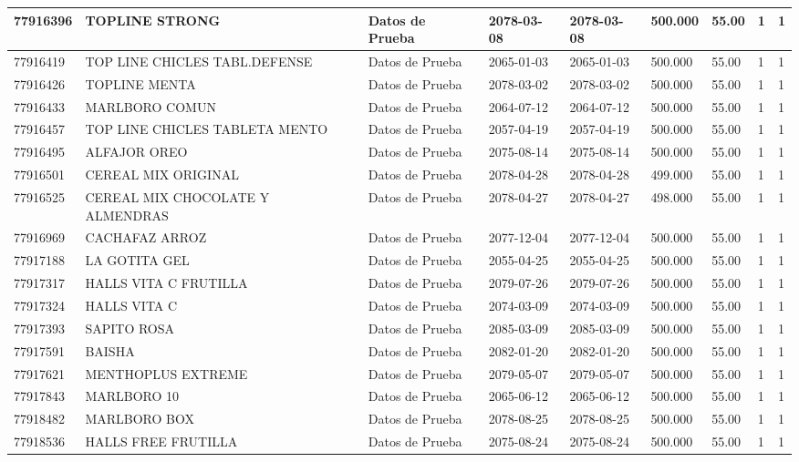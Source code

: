 \documentclass[a4paper,12pt]{article}
\begin{document}
\begin{landscape}
\begin{longtable}{|p{4cm}|p{2.5cm}|p{2.5cm}|p{1.8cm}|p{1.8cm}|p{1cm}|p{1cm}|p{3cm}|p{3cm}||}
77916396 & TOPLINE STRONG & Datos de Prueba & 2078-03-08 & 2078-03-08 & 500.000 & 55.00 & 1 & 1 \\ \hline 
77916419 & TOP LINE CHICLES TABL.DEFENSE & Datos de Prueba & 2065-01-03 & 2065-01-03 & 500.000 & 55.00 & 1 & 1 \\ \hline 
77916426 & TOPLINE  MENTA & Datos de Prueba & 2078-03-02 & 2078-03-02 & 500.000 & 55.00 & 1 & 1 \\ \hline 
77916433 & MARLBORO COMUN & Datos de Prueba & 2064-07-12 & 2064-07-12 & 500.000 & 55.00 & 1 & 1 \\ \hline 
77916457 & TOP LINE CHICLES TABLETA MENTO & Datos de Prueba & 2057-04-19 & 2057-04-19 & 500.000 & 55.00 & 1 & 1 \\ \hline 
77916495 & ALFAJOR OREO & Datos de Prueba & 2075-08-14 & 2075-08-14 & 500.000 & 55.00 & 1 & 1 \\ \hline 
77916501 & CEREAL MIX ORIGINAL & Datos de Prueba & 2078-04-28 & 2078-04-28 & 499.000 & 55.00 & 1 & 1 \\ \hline 
77916525 & CEREAL MIX CHOCOLATE Y ALMENDRAS & Datos de Prueba & 2078-04-27 & 2078-04-27 & 498.000 & 55.00 & 1 & 1 \\ \hline 
77916969 & CACHAFAZ ARROZ & Datos de Prueba & 2077-12-04 & 2077-12-04 & 500.000 & 55.00 & 1 & 1 \\ \hline 
77917188 & LA GOTITA GEL & Datos de Prueba & 2055-04-25 & 2055-04-25 & 500.000 & 55.00 & 1 & 1 \\ \hline 
77917317 & HALLS VITA C FRUTILLA & Datos de Prueba & 2079-07-26 & 2079-07-26 & 500.000 & 55.00 & 1 & 1 \\ \hline 
77917324 & HALLS VITA C & Datos de Prueba & 2074-03-09 & 2074-03-09 & 500.000 & 55.00 & 1 & 1 \\ \hline 
77917393 & SAPITO ROSA & Datos de Prueba & 2085-03-09 & 2085-03-09 & 500.000 & 55.00 & 1 & 1 \\ \hline 
77917591 & BAISHA & Datos de Prueba & 2082-01-20 & 2082-01-20 & 500.000 & 55.00 & 1 & 1 \\ \hline 
77917621 & MENTHOPLUS EXTREME & Datos de Prueba & 2079-05-07 & 2079-05-07 & 500.000 & 55.00 & 1 & 1 \\ \hline 
77917843 & MARLBORO 10 & Datos de Prueba & 2065-06-12 & 2065-06-12 & 500.000 & 55.00 & 1 & 1 \\ \hline 
77918482 & MARLBORO BOX & Datos de Prueba & 2078-08-25 & 2078-08-25 & 500.000 & 55.00 & 1 & 1 \\ \hline 
77918536 & HALLS FREE FRUTILLA & Datos de Prueba & 2075-08-24 & 2075-08-24 & 500.000 & 55.00 & 1 & 1 \\ \hline 

\end{longtable}
\end{landscape}
\end{document}
